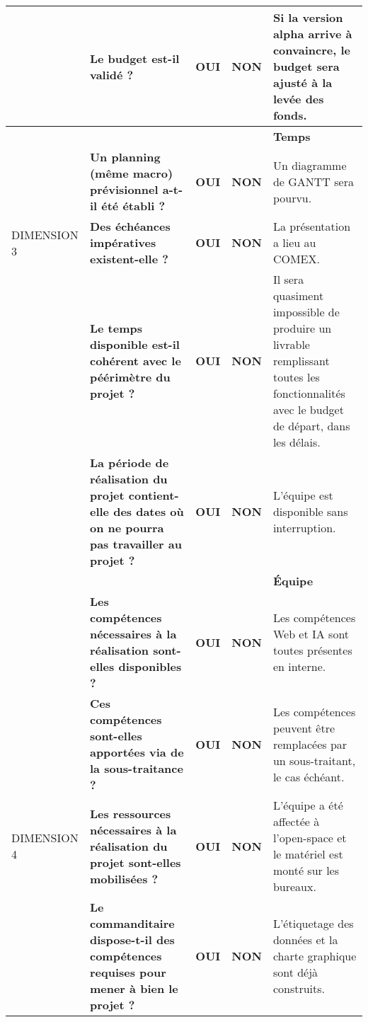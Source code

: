 \documentclass[12pt]{article}
\begin{document}
\begin{landscape}
\begin{table}[H]
{\begin{tabular}{p{2cm}p{}p{1cm}p{1cm}p{12.25cm}}
\cellcolor{red!90} & \bf Le budget est-il validé ? & \bf OUI \cellcolor{red!50}& \bf NON\cellcolor{green!50} & Si la version alpha arrive à convaincre, le budget sera ajusté à la levée des fonds. \\
\hline \cellcolor{orange!75}& \cellcolor{orange!75}& \cellcolor{orange!75}& \cellcolor{orange!75}&\bf Temps \cellcolor{orange!75}\\
\cellcolor{orange!75} & \bf Un planning (même macro) prévisionnel a-t-il été établi ? & \bf OUI \cellcolor{green!50}& \bf NON\cellcolor{red!50} & Un diagramme de GANTT sera pourvu. \\
DIMENSION 3\cellcolor{orange!75} & \bf Des échéances impératives existent-elle ? & \bf OUI \cellcolor{green!50}& \bf NON\cellcolor{red!50} & La présentation a lieu au COMEX. \\
\cellcolor{orange!75} & \bf Le temps disponible est-il cohérent avec le péérimètre du projet ? & \bf OUI \cellcolor{red!50}& \bf NON\cellcolor{green!50} & Il sera quasiment impossible de produire un livrable remplissant toutes les fonctionnalités avec le budget de départ, dans les délais. \\
\cellcolor{orange!75} & \bf La période de réalisation du projet contient-elle des dates où on ne pourra pas travailler au projet ? & \bf OUI \cellcolor{red!50}& \bf NON\cellcolor{green!50} & L’équipe est disponible sans interruption. \\
\hline \cellcolor{yellow!50}& \cellcolor{yellow!50}& \cellcolor{yellow!50}& \cellcolor{yellow!50}&\bf Équipe \cellcolor{yellow!50}\\
\cellcolor{yellow!50} & \bf Les compétences nécessaires à la réalisation sont-elles disponibles ? & \bf OUI \cellcolor{green!50}& \bf NON\cellcolor{red!50} & Les compétences Web et IA sont toutes présentes en interne. \\
\cellcolor{yellow!50} & \bf Ces compétences sont-elles apportées via de la sous-traitance ? & \bf OUI \cellcolor{red!50}& \bf NON\cellcolor{green!50} & Les compétences peuvent être remplacées par un sous-traitant, le cas échéant. \\
DIMENSION 4\cellcolor{yellow!50} & \bf Les ressources nécessaires à la réalisation du projet sont-elles mobilisées ? & \bf OUI \cellcolor{green!50}& \bf NON\cellcolor{red!50} & L’équipe a été affectée à l’open-space et le matériel est monté sur les bureaux. \\
\cellcolor{yellow!50} & \bf Le commanditaire dispose-t-il des compétences requises pour mener à bien le projet ? & \bf OUI \cellcolor{green!50}& \bf NON\cellcolor{red!50} & L’étiquetage des données et la charte graphique sont déjà construits. \\

\end{tabular}}
\end{table}
\end{landscape}
\end{document}
